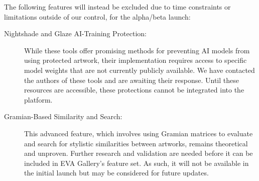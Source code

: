 \noindent
The following features will instead be excluded due to time constraints or limitations outside of our control, for the alpha/beta launch:

\begin{description}
    \item[Nightshade and Glaze AI-Training Protection:] While these tools offer promising methods for preventing AI models from using protected artwork, their implementation requires access to specific model weights that are not currently publicly available. We have contacted the authors of these tools and are awaiting their response. Until these resources are accessible, these protections cannot be integrated into the platform.
    \item[Gramian-Based Similarity and Search:] This advanced feature, which involves using Gramian matrices to evaluate and search for stylistic similarities between artworks, remains theoretical and unproven. Further research and validation are needed before it can be included in EVA Gallery's feature set. As such, it will not be available in the initial launch but may be considered for future updates.
\end{description}